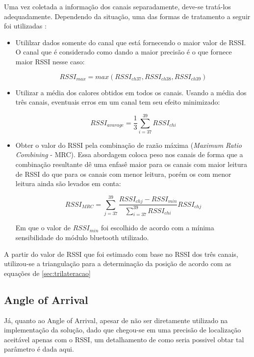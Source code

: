 Uma vez coletada a informação dos canais separadamente, deve-se tratá-los adequadamente. Dependendo da situação, uma das formas de tratamento a seguir foi utilizadas : 

\begin{itemize}

    \item Utililzar dados somente do canal que está fornecendo o maior valor de RSSI. O canal que é considerado como dando a maior precisão é o que fornece maior RSSI nesse caso:
    
    \begin{equation}
        RSSI_{max} = max(RSSI_{ch37}, RSSI_{ch38}, RSSI_{ch39})
    \end{equation}

    \item  Utilizar a média dos calores obtidos em todos os canais. Usando a média dos três canais, eventuais erros em um canal tem seu efeito minimizado:
    
    \begin{equation}
        RSSI_{avarage} = \frac{1}{3} \sum_{i=37}^{39}  RSSI_{ch i}
    \end{equation}
    

    \item Obter o valor do RSSI pela combinação de razão máxima (\textit{Maximum Ratio Combining} - MRC). Essa abordagem coloca peso nos canais de forma que a combinação resultante dê uma enfasê maior para os canais com maior leitura de RSSI do que para os canais com menor leitura, porém os com menor leitura ainda são levados em conta:

    \begin{equation}
        RSSI_{MRC} = \sum_{j=37}^{39} \frac{RSSI_{ch j} - RSSI_{min}}{\sum_{i=37}^{39}  RSSI_{ch i}} RSSI_{ch j}
    \end{equation}

    Em que o valor de \( RSSI_{min} \) foi escolhido de acordo com a mínima sensibilidade do módulo bluetooth utilizado.


\end{itemize}

A partir do valor de RSSI que foi estimado com base no RSSI dos três canais, utilizou-se a triangulação para a determinação da posição de acordo com as equações de \ref{sec:trilateracao}



\subsection{Angle of Arrival}
Já, quanto ao Angle of Arrival, apesar de não ser diretamente utilizado na implementação da solução, dado que chegou-se em uma precisão de localização aceitável apenas com o RSSI, um detalhamento de como seria possivel obtar tal parâmetro é dada aqui.

